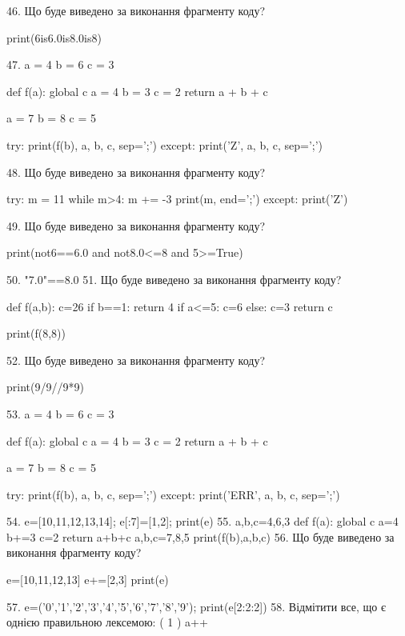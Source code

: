 \documentclass[11pt]{article}
\begin{document}
46. Що буде виведено за виконання фрагменту коду?

print(6is6.0is8.0is8)

47. 
a = 4
b = 6
c = 3

def f(a):
global c    a = 4
    b = 3
    c = 2
    return a + b + c

a = 7
b = 8
c = 5

try:
    print(f(b), a, b, c, sep=';')
except:
    print('Z', a, b, c, sep=';')

48. Що буде виведено за виконання фрагменту коду?

try:
    m = 11
    while m>4:
        m += -3
    print(m, end=';')
except:
    print('Z')


49. Що буде виведено за виконання фрагменту коду?

print(not6==6.0 and not8.0<=8 and 5>=True)

50. 
"7.0"==8.0
51. Що буде виведено за виконання фрагменту коду?

def f(a,b):
    c=26
    if b==1:
        return 4
    if a<=5:
         c=6
    else: 
        c=3
    return c

print(f(8,8))

52. Що буде виведено за виконання фрагменту коду?

print(9/9//9*9)

53. 
a = 4
b = 6
c = 3

def f(a):
global c    a = 4
    b = 3
    c = 2
    return a + b + c

a = 7
b = 8
c = 5

try:
    print(f(b), a, b, c, sep=';')
except:
    print('ERR', a, b, c, sep=';')

54. 
e=[10,11,12,13,14]; e[:7]=[1,2]; print(e)
55. 
a,b,c=4,6,3
    def f(a):
      global c      a=4
      b+=3
      c=2
      return a+b+c
    a,b,c=7,8,5
    print(f(b),a,b,c)
56. Що буде виведено за виконання фрагменту коду?

e=[10,11,12,13]
e+=[2,3]
print(e)


57. 
e=('0','1','2','3','4','5','6','7','8','9'); print(e[2:2:2])
58. %
Відмітити все, що є однією правильною лексемою:
( 1 ) a++
\end{document}
